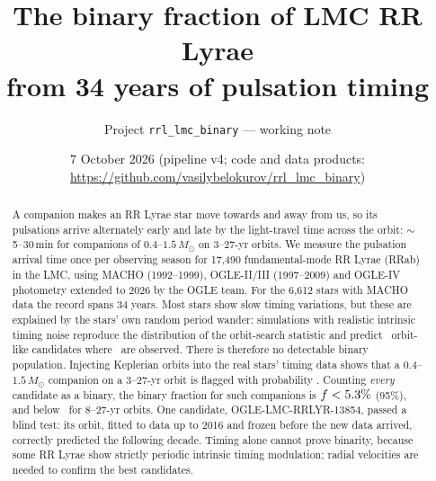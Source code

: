 \documentclass[11pt]{article}
\title{\bf The binary fraction of LMC RR Lyrae\\ from 34 years of pulsation timing}
\author{Project \texttt{rrl\_lmc\_binary} --- working note}
\date{7 October 2026 (pipeline v4; code and data products: \url{https://github.com/vasilybelokurov/rrl_lmc_binary})}
\newcommand{\Msun}{\ensuremath{M_\odot}}
\begin{document}
\maketitle

\begin{abstract}
A companion makes an RR Lyrae star move towards and away from us, so its pulsations arrive alternately early and late by the
light-travel time across the orbit: $\sim$5--30\,min for companions of $0.4$--$1.5\,\Msun$ on 3--27-yr orbits. We measure the
pulsation arrival time once per observing season for 17{,}490 fundamental-mode RR Lyrae (RRab) in the LMC, using MACHO
(1992--1999), OGLE-II/III (1997--2009) and OGLE-IV photometry extended to 2026 by the OGLE team. For the 6{,}612 stars with
MACHO data the record spans 34 years. Most stars show slow timing variations, but these are explained by the stars' own
random period wander: simulations with realistic intrinsic timing noise reproduce the distribution of the orbit-search
statistic and predict \EXPECTED\ orbit-like candidates where \NCAND\ are observed. There is therefore no detectable binary
population. Injecting Keplerian orbits into the real stars' timing data shows that a $0.4$--$1.5\,\Msun$ companion on a
3--27-yr orbit is flagged with probability \EPS. Counting \emph{every} candidate as a binary, the binary fraction for such
companions is $f<5.3\%$ (95\%), and below \FMAXLONG\ for 8--27-yr orbits. One candidate, OGLE-LMC-RRLYR-13854, passed a blind test: its
orbit, fitted to data up to 2016 and frozen before the new data arrived, correctly predicted the following decade. Timing alone
cannot prove binarity, because some RR Lyrae show strictly periodic intrinsic timing modulation; radial velocities are needed
to confirm the best candidates.
\end{abstract}

\tableofcontents

\end{document}
